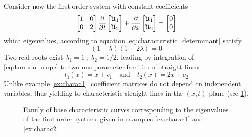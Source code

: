 \begin{example}
  \label{ex:charac2}
  Consider now the first order system with constant coefficients
\begin{equation*}
 \left[\begin{matrix}1 &0 \\0 &2\end{matrix}\right] \frac{\partial }{\partial t} \left[\begin{matrix}\mathcal{U}_1 \\ \mathcal{U}_2\end{matrix}\right] + \frac{\partial }{\partial x}\left[\begin{matrix}\mathcal{U}_1 \\ \mathcal{U}_2\end{matrix}\right] = \left[\begin{matrix}0 \\0\end{matrix}\right]
\end{equation*}
which eigenvalues, according to equation \eqref{eq:characteristic_determinant} satisfy
\begin{equation*}
  (1 - \lambda )(1- 2\lambda)=0
\end{equation*}
Two real roots exist $\lambda_1=1 \: ; \: \lambda_2=1/2$, leading by integration of \eqref{eq:lambda_slope} to two one-parameter families of straight lines:
\begin{equation*}
  t_1(x)=x+c_1  \quad \text{and} \quad t_2(x)=2x+c_2 
\end{equation*}
Unlike example \ref{ex:charac1}, coefficient matrices do not depend on independent variables, thus yielding to characteristic straight lines in the $(x,t)$ plane (see \ref{fig:exampleCharac}).
\end{example}
\begin{figure}[h]
  \centering
  \caption{Family of base characteristic curves corresponding to the eigenvalues of the first order systems given in examples \ref{ex:charac1} and \ref{ex:charac2}.}
  \label{fig:exampleCharac}
\end{figure}

